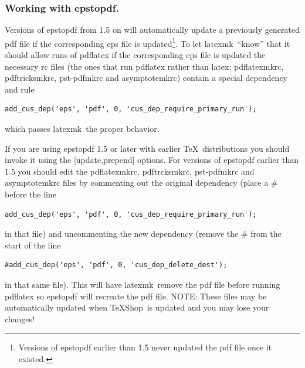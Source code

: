 \documentclass[11pt]{article}
\newcommand{\cmd}[1]{\textsf{#1}}
\newcommand{\TS}{\textsf{\TeX Shop}}
\newcommand{\latexmk}{\textsf{latexmk}}
\begin{document}
\subsubsection{Working with \cmd{epstopdf}.}

Versions of \cmd{epstopdf} from 1.5 on will automatically update a previously generated \cmd{pdf} file if the corresponding \cmd{eps} file is updated\footnote{Versions of \cmd{epstopdf} earlier than 1.5 never updated the \cmd{pdf} file once it existed.}. To let \latexmk\ ``know'' that it should allow runs of \cmd{pdflatex} if the corresponding \cmd{eps} file is updated the necessary \cmd{rc} files (the ones that run \cmd{pdflatex} rather than \cmd{latex}; \cmd{pdflatexmkrc}, \cmd{pdftricksmkrc}, \cmd{pst-pdfmkrc} and \cmd{asymptotemkrc}) contain a special dependency and rule
\begin{verbatim}
add_cus_dep('eps', 'pdf', 0, 'cus_dep_require_primary_run');
\end{verbatim}
which passes \latexmk\ the proper behavior.

If you are using \cmd{epstopdf} 1.5 or later with earlier \TeX\ distributions you should invoke it using the \cmd{[update,prepend]} options. For versions of \cmd{epstopdf} earlier than 1.5 you should edit the \cmd{pdflatexmkrc}, \cmd{pdftrcksmkrc}, \cmd{pst-pdfmkrc} and \cmd{asymptotemkrc} files by commenting out the original dependency (place a \cmd{\#} before the line
\begin{verbatim}
add_cus_dep('eps', 'pdf', 0, 'cus_dep_require_primary_run');
\end{verbatim}
in that file) and uncommenting the new dependency (remove the \cmd{\#} from the start of the line
\begin{verbatim}
#add_cus_dep('eps', 'pdf', 0, 'cus_dep_delete_dest');
\end{verbatim}
in that same file). This will have \latexmk\ remove the \cmd{pdf} file before running \cmd{pdflatex} so \cmd{epstopdf} will recreate the \cmd{pdf} file. NOTE: These files may be automatically updated when \TS\ is updated and you may lose your changes!
\end{document}
